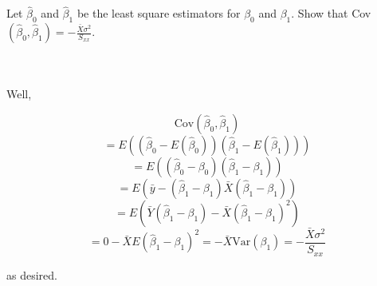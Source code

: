 Let $\hat{\beta}_0$ and $\hat{\beta}_1$ be the least square estimators for $\beta_0$ and $\beta_1$.
Show that Cov$(\hat{\beta}_0,\hat{\beta}_1)=-\frac{\bar{X}\sigma^2}{S_{xx}}$.\\\\

\begin{solution}\renewcommand{\qedsymbol}{}\ \\
    Well,
    
    $$\text{Cov}(\hat{\beta}_0, \hat{\beta}_1)$$
    $$=E((\hat{\beta}_0-E(\hat{\beta}_0))(\hat{\beta}_1-E(\hat{\beta}_1)))$$
    $$=E((\hat{\beta}_0-\beta_0)(\hat{\beta}_1-\beta_1))$$
    $$=E(\bar{y}-(\hat{\beta}_1-\beta_1)\bar{X}(\hat{\beta}_1-\beta_1))$$
    $$=E(\bar{Y}(\hat{\beta}_1-\beta_1)-\bar{X}(\hat{\beta}_1-\beta_1)^2)$$
    $$=0-\bar{X}E(\hat{\beta}_1-\beta_1)^2=-\bar{X}\text{Var}(\beta_1)=-\frac{\bar{X}\sigma^2}{S_{xx}}$$
    
    as desired.

\end{solution}